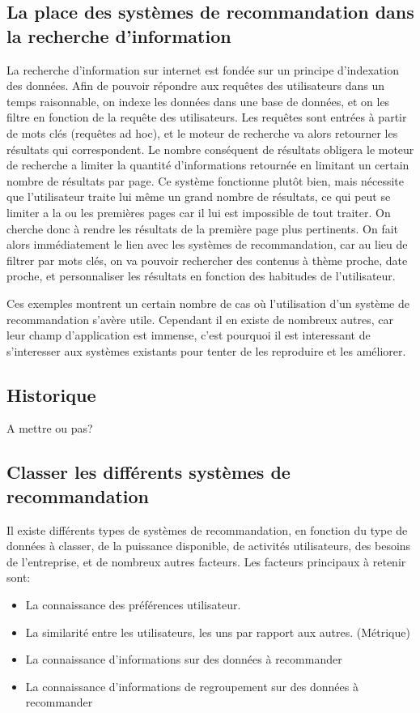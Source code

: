 \documentclass{report}
\begin{document}
\newpage
\subsection{La place des systèmes de recommandation dans la recherche d'information}

La recherche d'information sur internet est fondée sur un principe d'indexation des données. Afin de pouvoir répondre aux requêtes des utilisateurs dans un temps raisonnable, on indexe les données dans une base de données, et on les filtre en fonction de la requête des utilisateurs. Les requêtes sont entrées à partir de mots clés (requêtes ad hoc), et le moteur de recherche va alors retourner les résultats qui correspondent.
Le nombre conséquent de résultats obligera le moteur de recherche a limiter la quantité d'informations retournée en limitant un certain nombre de résultats par page.
Ce système fonctionne plutôt bien, mais nécessite que l'utilisateur traite lui même un grand nombre de résultats, ce qui peut se limiter a la ou les premières pages car il lui est impossible de tout traiter.
On cherche donc à rendre les résultats de la première page plus pertinents. On fait alors immédiatement le lien avec les systèmes de recommandation, car au lieu de filtrer par mots clés, on va pouvoir rechercher des contenus à thème proche, date proche, et personnaliser les résultats en fonction des habitudes de l'utilisateur.\par

Ces exemples montrent un certain nombre de cas où l'utilisation d'un système de recommandation s'avère utile. Cependant il en existe de nombreux autres, car leur champ d'application est immense, c'est pourquoi il est interessant de s'interesser aux systèmes existants pour tenter de les reproduire et les améliorer.

\subsection{Historique}
A mettre ou pas?

\newpage
\subsection{Classer les différents systèmes de recommandation}
Il existe différents types de systèmes de recommandation, en fonction du type de données à classer, de la puissance disponible, de activités utilisateurs, des besoins de l'entreprise, et de nombreux autres facteurs.
Les facteurs principaux à retenir sont:
\begin{itemize}
	\item La connaissance des préférences utilisateur.
	\item La similarité entre les utilisateurs, les uns par rapport aux autres. (Métrique)
	\item La connaissance d'informations sur des données à recommander
	\item La connaissance d'informations de regroupement sur des données à recommander
\end{itemize}
\end{document}

